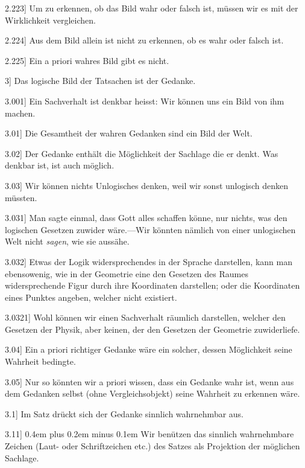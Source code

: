 \documentclass[12pt,oneside]{book}[2007/10/19]
\newcommand{\PropERef}[1]{\hyperref[PropE:#1]{#1}}
\newcommand{\PropositionG}[2]{%
  \item[\phantomsection\label{PropG:#1}\PropERef{#1}] #2%
}
\newcommand{\Emph}[1]{\emph{#1}}%
\newcommand{\stretchyspace}{\spaceskip0.4em plus 0.2em minus 0.1em}
\begin{document}
\begin{propositions}
\PropositionG{2.223}
{Um zu erkennen, ob das Bild wahr oder falsch
ist, müssen wir es mit der Wirklichkeit vergleichen.}


\PropositionG{2.224}
{Aus dem Bild allein ist nicht zu erkennen, ob
es wahr oder falsch ist.}


\PropositionG{2.225}
{Ein a priori wahres Bild gibt es nicht.}


\PropositionG{3}
{Das logische Bild der Tatsachen ist der
Gedanke.}


\PropositionG{3.001}
{\glqq{}Ein Sachverhalt ist denkbar\grqq{} heisst: Wir
können uns ein Bild von ihm machen.}


\PropositionG{3.01}
{Die Gesamtheit der wahren Gedanken sind
ein Bild der Welt.}


\PropositionG{3.02}
{Der Gedanke enthält die Möglichkeit der
Sachlage die er denkt. Was denkbar ist, ist
auch möglich.}


\PropositionG{3.03}
{Wir können nichts Unlogisches denken, weil
wir sonst unlogisch denken müssten.}


\PropositionG{3.031}
{Man sagte einmal, dass Gott alles schaffen
könne, nur nichts, was den logischen Gesetzen
zuwider wäre.---Wir könnten nämlich von einer
\glqq{}unlogischen\grqq{} Welt nicht \Emph{sagen}, wie sie aussähe.}


\PropositionG{3.032}
{Etwas \glqq{}der Logik widersprechendes\grqq{} in der
Sprache darstellen, kann man ebensowenig, wie
in der Geometrie eine den Gesetzen des Raumes
widersprechende Figur durch ihre Koordinaten
darstellen; oder die Koordinaten eines Punktes
angeben, welcher nicht existiert.}


\PropositionG{3.0321}
{Wohl können wir einen Sachverhalt räumlich
darstellen, welcher den Gesetzen der Physik,
aber keinen, der den Gesetzen der Geometrie
zuwiderliefe.}


\PropositionG{3.04}
{Ein a priori richtiger Gedanke wäre ein solcher,
dessen Möglichkeit seine Wahrheit bedingte.}


\PropositionG{3.05}
{Nur so könnten wir a priori wissen, dass ein
Gedanke wahr ist, wenn aus dem Gedanken
selbst (ohne Vergleichsobjekt) seine Wahrheit
zu erkennen wäre.}


\PropositionG{3.1}
{Im Satz drückt sich der Gedanke sinnlich
wahrnehmbar aus.}


\PropositionG{3.11}
{{\stretchyspace
Wir benützen das sinnlich wahrnehmbare
Zeichen (Laut- oder Schriftzeichen etc.) des Satzes
als Projektion der möglichen Sachlage.}

}
\end{propositions}
\end{document}
